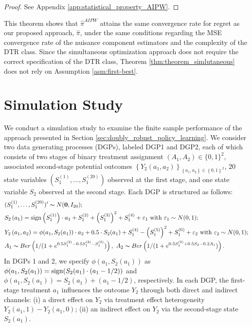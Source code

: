 \begin{proof}
See Appendix \ref{app:statistical_property_AIPW}.
\end{proof}

\medskip

This theorem shows that $\hat{\pi}^{AIPW}$ attains the same convergence rate for regret as our proposed approach, $\hat{\pi}$, under the same conditions regarding the MSE convergence rate of the nuisance component estimators and the complexity of the DTR class. Since the simultaneous optimization approach does not require the correct specification of the DTR class, Theorem \ref{thm:theorem_simlutaneous} does not rely on Assumption \ref{asm:first-best}.


\section{Simulation Study}\label{sec:simulation}


We conduct a simulation study to examine the finite sample performance of the approach presented in Section \ref{sec:doubly_robust_policy_learning}.
We consider two data generating processes (DGPs), labeled DGP1 and DGP2, each of which consists of two stages of binary treatment assignment $(A_{1},A_{2}) \in \{0,1\}^2$, associated second-stage potential outcomes $\left\{Y_2\left(a_{1},a_{2}\right)\right\}_{\left\{ a_{1},a_{2}\right\} \in\left\{ 0,1\right\} ^{2}}$,
$20$ state variables $(S_{1}^{(1)},\ldots,S_{1}^{(20)})$ observed at the first stage, and one state variable $S_2$ observed at the second stage. Each DGP is structured as follows:
\begin{align*}
&(S_{1}^{(1)},\ldots,S_{1}^{(20)})^{\prime} \thicksim N(\boldsymbol{0},I_{20});\\
&S_{2}\left(a_{1}\right)=  \mathrm{sign}\left(S_{1}^{(1)}\right)\cdot a_{1}+ S_{1}^{(2)} + \left(S_{1}^{(3)}\right)^2 + S_{1}^{(4)} + \varepsilon_{1} \mbox{\ with\ }\varepsilon_{1} \sim N(0,1);\\
&Y_{2}\left(a_{1},a_{2}\right) =  \phi(a_1,S_2(a_1))\cdot a_{2} 
    + 0.5 \cdot S_{2}(a_1) + S_{1}^{(4)} - \left(S_{1}^{(5)}\right)^2 + S_{1}^{(6)} + \varepsilon_{2} \mbox{\ with\ } \varepsilon_{2} \sim N(0,1);\\
&A_{1} \thicksim Ber\left(1/(1+e^{0.5 S_{1}^{(2)}-0.5S_{1}^{(3)}-S_{1}^{(5)}})\right),\ A_{2} \thicksim Ber\left(1/(1+e^{0.5S_{1}^{(5)}+0.5 S_{2}-0.2A_{1}})\right).
\end{align*}
In DGPs 1 and 2, we specify $\phi(a_1,S_2(a_1))$ as $\phi(a_1,S_2(a_1)) = \mathrm{sign}(S_2(a_1)\cdot (a_1 - 1/2))$ and $\phi(a_1,S_2(a_1)) = S_2(a_1) + (a_1 - 1/2)$, respectively. In each DGP, the first-stage treatment $a_1$ influences the outcome $Y_2$ through both direct and indirect channels: (i) a direct effect on $Y_2$ via treatment effect heterogeneity $Y_2(a_1,1)-Y_2(a_1,0)$; (ii) an indirect effect on $Y_2$ via the second-stage state $S_2(a_1)$. 

